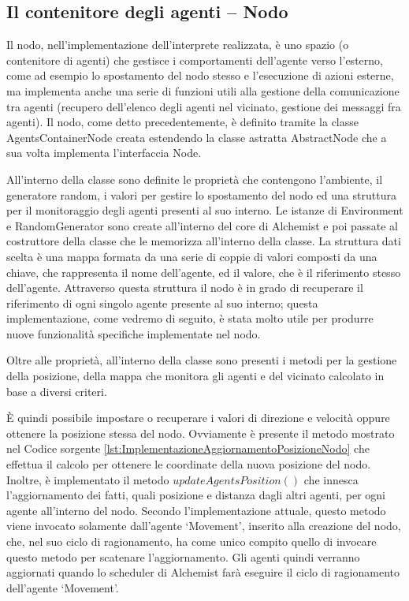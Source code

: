 \subsection{Il contenitore degli agenti -- Nodo}\label{sctn:AgentsContainerNode}
Il nodo, nell'implementazione dell'interprete realizzata, è uno spazio (o contenitore di agenti) che gestisce i comportamenti dell'agente verso l'esterno, come ad esempio lo spostamento del nodo stesso e l'esecuzione di azioni esterne, ma implementa anche una serie di funzioni utili alla gestione della comunicazione tra agenti (recupero dell'elenco degli agenti nel vicinato, gestione dei messaggi fra agenti). Il nodo, come detto precedentemente, è definito tramite la classe AgentsContainerNode creata estendendo la classe astratta AbstractNode che a sua volta implementa l'interfaccia Node.

All'interno della classe sono definite le proprietà che contengono l'ambiente, il generatore random, i valori per gestire lo spostamento del nodo ed una struttura per il monitoraggio degli agenti presenti al suo interno.
Le istanze di Environment e RandomGenerator sono create all'interno del core di Alchemist e poi passate al costruttore della classe che le memorizza all'interno della classe. %
La struttura dati scelta è una mappa formata da una serie di coppie di valori composti da una chiave, che rappresenta il nome dell'agente, ed il valore, che è il riferimento stesso dell'agente. Attraverso questa struttura il nodo è in grado di recuperare il riferimento di ogni singolo agente presente al suo interno; questa implementazione, come vedremo di seguito, è stata molto utile per produrre nuove funzionalità specifiche implementate nel nodo.

Oltre alle proprietà, all'interno della classe sono presenti i metodi per la gestione della posizione, della mappa che monitora gli agenti e del vicinato calcolato in base a diversi criteri.

È quindi possibile impostare o recuperare i valori di direzione e velocità oppure ottenere la posizione stessa del nodo. Ovviamente è presente il metodo mostrato nel Codice sorgente \ref{lst:ImplementazioneAggiornamentoPosizioneNodo} che effettua il calcolo per ottenere le coordinate della nuova posizione del nodo.
Inoltre, è implementato il metodo $updateAgentsPosition()$ che innesca l'aggiornamento dei fatti, quali posizione e distanza dagli altri agenti, per ogni agente all'interno del nodo. Secondo l'implementazione attuale, questo metodo viene invocato solamente dall'agente `Movement', inserito alla creazione del nodo, che, nel suo ciclo di ragionamento, ha come unico compito quello di invocare questo metodo per scatenare l'aggiornamento. Gli agenti quindi verranno aggiornati quando lo scheduler di Alchemist farà eseguire il ciclo di ragionamento dell'agente `Movement'.

